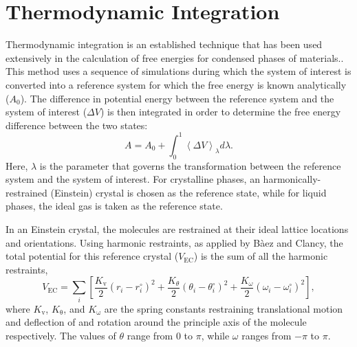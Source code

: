 \documentclass[]{book}
\begin{document}

\chapter{\label{section:thermInt}Thermodynamic Integration}

Thermodynamic integration is an established technique that has been
used extensively in the calculation of free energies for condensed
phases of
materials.\cite{Frenkel84,Hermens88,Meijer90,Baez95a,Vlot99}.  This
method uses a sequence of simulations during which the system of
interest is converted into a reference system for which the free
energy is known analytically ($A_0$).  The difference in potential
energy between the reference system and the system of interest
($\Delta V$) is then integrated in order to determine the free energy
difference between the two states:
\begin{equation}
 A = A_0 + \int_0^1 \left\langle \Delta V \right\rangle_\lambda
d\lambda.
\label{eq:thermInt}
\end{equation}
Here, $\lambda$ is the parameter that governs the transformation
between the reference system and the system of interest.  For
crystalline phases, an harmonically-restrained (Einstein) crystal is
chosen as the reference state, while for liquid phases, the ideal gas
is taken as the reference state.  

In an Einstein crystal, the molecules are restrained at their ideal
lattice locations and orientations. Using harmonic restraints, as
applied by B\`{a}ez and Clancy, the total potential for this reference
crystal ($V_\mathrm{EC}$) is the sum of all the harmonic restraints,
\begin{equation}
V_\mathrm{EC} = \sum_{i} \left[ \frac{K_\mathrm{v}}{2} (r_i - r_i^\circ)^2 +
\frac{K_\theta}{2} (\theta_i - \theta_i^\circ)^2 +
\frac{K_\omega}{2}(\omega_i - \omega_i^\circ)^2 \right],
\end{equation}
where $K_\mathrm{v}$, $K_\mathrm{\theta}$, and $K_\mathrm{\omega}$ are
the spring constants restraining translational motion and deflection
of and rotation around the principle axis of the molecule
respectively.  The values of $\theta$ range from $0$ to $\pi$, while
$\omega$ ranges from $-\pi$ to $\pi$.
\end{document}
